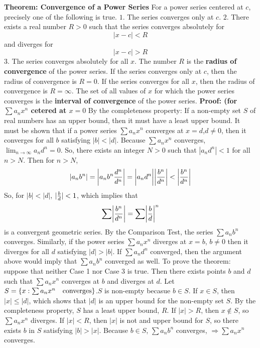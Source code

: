 \nopagenumbers
{\bf Theorem: Convergence of a Power Series}
\vskip 6pt
For a power series centered at $c$, precisely one of the following is true.
\vskip 1mm
$1.$ The series converges only at $c$.
\vskip 1mm
$2.$ There exists a real number $R>0$ such that the series converges absolutely for $$|x-c|<R$$ and diverges for $$|x-c|>R$$
\vskip 1mm
$3.$ The series converges absolutely for all $x$.
\vskip 6mm
The number $R$ is the {\bf radius of convergence} of the power series. If the series converges only at $c$, then the radius of convergence is $R=0$. If the series converges for all $x$, then the radius of convergence is $R=\infty$. The set of all values of $x$ for which the power series converges is the {\bf interval of convergence} of the power series.
\vskip 10pt
{\bf Proof: (for $\sum a_nx^n$ cetered at $x=0$}
\vskip 6pt
By the completeness property: If a non-empty set $S$ of real numbers has an upper bound, then it must have a least upper bound.
\vskip 1mm
It must be shown that if a power series $\sum a_nx^n$ converges at $x=d$,$d\neq 0$, then it converges for all $b$ satisfying $|b|<|d|$. Because $\sum a_nx^n$ converges, $\lim_{n\to\infty}a_nd^n=0$. So, there exists an integer $N>0$ such that $|a_nd^n|<1$ for all $n>N$.
\vskip 1mm
Then for $n>N$, $$|a_nb^n|=\biggl|a_nb^n{d^n\over d^n}\biggr|=\biggl|a_nd^n\biggr|\biggl|{b^n\over d^n}\biggr|<\biggl|{b^n\over d^n}\biggr|$$ So, for $|b|<|d|$, $|{b\over d}|<1$, which implies that $$\sum \biggl| {b^n\over d^n}\biggr|=\sum \biggl|{b\over d}\biggr|^n$$ is a convergent geometric series. By the Comparison Test, the series $\sum a_nb^n$ converges.
\vskip 1mm
Similarly, if the power series $\sum a_nx^n$ diverges at $x=b$, $b\neq 0$ then it diverges for all $d$ satisfying $|d|>|b|$. If $\sum a_nd^n$ converged, then the argument above would imply that $\sum a_nb^n$ converged as well.
\vskip 1mm
To prove the theorem: suppose that neither Case 1 nor Case 3 is true. Then there exists points $b$ and $d$ such that $\sum a_nx^n$ converges at $b$ and diverges at $d$. Let $S=\lbrace x: \sum a_nx^n\quad\hbox{converges} \rbrace$.$S$ is non-empty becasue $b\in S$. If $x\in S$, then $|x|\leq |d|$, which shows that $|d|$ is an upper bound for the non-empty set $S$.
\vskip 1mm
By the completeness property, $S$ has a least upper bound, $R$. If $|x|>R$, then $x\not\in S$, so $\sum a_nx^n$ diverges. If $|x|<R$, then $|x|$ is not and upper bound for $S$, so there exists $b$ in $S$ satisfying $|b|>|x|$. Because $b\in S$, $\sum a_nb^n$ converges, $\Longrightarrow \sum a_nx^n$ converges.
\vfill\eject
